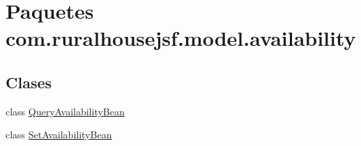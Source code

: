 \hypertarget{namespacecom_1_1ruralhousejsf_1_1model_1_1availability}{}\section{Paquetes com.\+ruralhousejsf.\+model.\+availability}
\label{namespacecom_1_1ruralhousejsf_1_1model_1_1availability}
\subsection*{Clases}
\begin{DoxyCompactItemize}
\item 
class \mbox{\hyperlink{classcom_1_1ruralhousejsf_1_1model_1_1availability_1_1_query_availability_bean}{Query\+Availability\+Bean}}
\item 
class \mbox{\hyperlink{classcom_1_1ruralhousejsf_1_1model_1_1availability_1_1_set_availability_bean}{Set\+Availability\+Bean}}
\end{DoxyCompactItemize}
